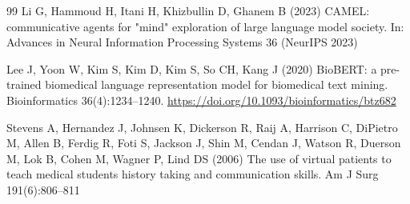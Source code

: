 \documentclass[12pt]{article}
\begin{document}
\begin{thebibliography}{99}
Li G, Hammoud H, Itani H, Khizbullin D, Ghanem B (2023) CAMEL: communicative agents for "mind" exploration of large language model society. In: Advances in Neural Information Processing Systems 36 (NeurIPS 2023)

Lee J, Yoon W, Kim S, Kim D, Kim S, So CH, Kang J (2020) BioBERT: a pre-trained biomedical language representation model for biomedical text mining. Bioinformatics 36(4):1234--1240. \url{https://doi.org/10.1093/bioinformatics/btz682}

Stevens A, Hernandez J, Johnsen K, Dickerson R, Raij A, Harrison C, DiPietro M, Allen B, Ferdig R, Foti S, Jackson J, Shin M, Cendan J, Watson R, Duerson M, Lok B, Cohen M, Wagner P, Lind DS (2006) The use of virtual patients to teach medical students history taking and communication skills. Am J Surg 191(6):806--811

\end{thebibliography}
\end{document}
